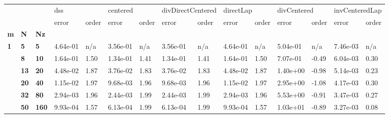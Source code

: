 \begin{tabular}{lllllllllllllll}
\toprule
  &    &     & \multicolumn{2}{l}{dss} & \multicolumn{2}{l}{centered} & \multicolumn{2}{l}{divDirectCentered} & \multicolumn{2}{l}{directLap} & \multicolumn{2}{l}{divCentered} & \multicolumn{2}{l}{invCenteredLap} \\
  &    &     &     error & order &     error & order &             error & order &     error & order &       error &  order &          error & order \\
\textbf{m} & \textbf{N} & \textbf{Nz} &           &       &           &       &                   &       &           &       &             &        &                &       \\
\midrule
\textbf{1} & \textbf{5 } & \textbf{5  } &  4.64e-01 &   n/a &  3.56e-01 &   n/a &          3.56e-01 &   n/a &  4.64e-01 &   n/a &    5.04e-01 &    n/a &       7.46e-03 &   n/a \\
  & \textbf{8 } & \textbf{10 } &  1.64e-01 &  1.50 &  1.34e-01 &  1.41 &          1.34e-01 &  1.41 &  1.64e-01 &  1.50 &    7.07e-01 &  -0.49 &       6.04e-03 &  0.30 \\
  & \textbf{13} & \textbf{20 } &  4.48e-02 &  1.87 &  3.76e-02 &  1.83 &          3.76e-02 &  1.83 &  4.48e-02 &  1.87 &    1.40e+00 &  -0.98 &       5.14e-03 &  0.23 \\
  & \textbf{20} & \textbf{40 } &  1.15e-02 &  1.97 &  9.68e-03 &  1.96 &          9.68e-03 &  1.96 &  1.15e-02 &  1.97 &    2.95e+00 &  -1.08 &       4.17e-03 &  0.30 \\
  & \textbf{32} & \textbf{80 } &  2.94e-03 &  1.96 &  2.44e-03 &  1.99 &          2.44e-03 &  1.99 &  2.94e-03 &  1.96 &    5.53e+00 &  -0.91 &       3.47e-03 &  0.27 \\
  & \textbf{50} & \textbf{160} &  9.93e-04 &  1.57 &  6.13e-04 &  1.99 &          6.13e-04 &  1.99 &  9.93e-04 &  1.57 &    1.03e+01 &  -0.89 &       3.27e-03 &  0.08 \\
\bottomrule
\end{tabular}
